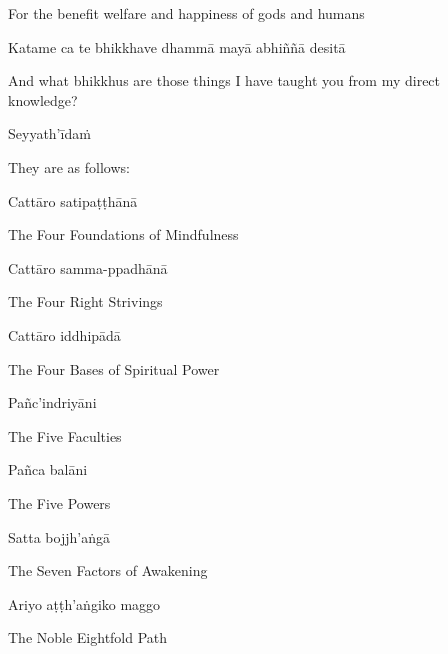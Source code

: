 \begin{english-hang}
  For the benefit welfare and happiness of gods and humans
\end{english-hang}

\begin{pali-hang}
Katame ca te bhikkhave dhammā mayā abhiññā desitā
\end{pali-hang}

\begin{english-hang}
  And what bhikkhus are those things I have taught you from my direct knowledge?
\end{english-hang}

Seyyath'īdaṁ

\begin{english}
  They are as follows:
\end{english}

\ifafive\clearpage\fi
\ifbfive\clearpage\fi

Cattāro satipaṭṭhānā

\begin{english}
  The Four Foundations of Mindfulness
\end{english}

Cattāro samma-ppadhānā

\begin{english}
  The Four Right Strivings
\end{english}

Cattāro iddhipādā

\begin{english}
  The Four Bases of Spiritual Power
\end{english}

Pañc'indriyāni

\begin{english}
  The Five Faculties
\end{english}

Pañca balāni

\begin{english}
  The Five Powers
\end{english}

\ifninebythirteen\clearpage\fi

Satta bojjh'aṅgā

\begin{english}
  The Seven Factors of Awakening
\end{english}

Ariyo aṭṭh'aṅgiko maggo

\begin{english}
  The Noble Eightfold Path
\end{english}

